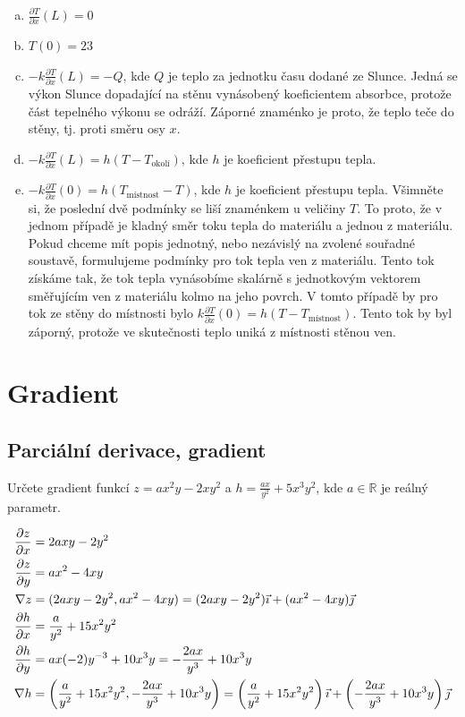 \begin{enumerate}[a)]
\item $\frac{\partial T}{\partial x}(L)=0$
\item $T(0)=23$
\item $-k\frac{\partial T}{\partial x}(L)=-Q$, kde $Q$ je teplo za jednotku času dodané ze Slunce. Jedná se výkon Slunce dopadající na stěnu vynásobený koeficientem absorbce, protože část tepelného výkonu se odráží. Záporné znaménko je proto, že teplo teče do stěny, tj. proti směru osy $x$.
\item $-k\frac{\partial T}{\partial x}(L)=h(T-T_{\text{okolí}})$, kde $h$ je koeficient přestupu tepla.
\item $-k\frac{\partial T}{\partial x}(0)=h(T_{\text{místnost}}-T)$, kde $h$ je koeficient přestupu tepla.
  Všimněte si, že poslední dvě podmínky se liší znaménkem u veličiny $T$. To proto, že v jednom případě je kladný směr toku tepla do materiálu a jednou z materiálu. Pokud chceme mít popis jednotný, nebo nezávislý na zvolené souřadné soustavě, formulujeme podmínky pro tok tepla ven z materiálu. Tento tok získáme tak, že tok tepla vynásobíme skalárně s jednotkovým vektorem směřujícím ven z materiálu kolmo na jeho povrch. V tomto případě by pro tok ze stěny do místnosti bylo $k\frac{\partial T}{\partial x}(0)=h(T-T_{\text{místnost}})$. Tento tok by byl záporný, protože ve skutečnosti teplo uniká z místnosti stěnou ven.
\end{enumerate}
\konec


\section{Gradient}

\subsection{Parciální derivace, gradient}

Určete gradient funkcí $z=ax^2y-2xy^2$ a $h=\frac {ax}{y^2}+5x^3y^2$, kde $a\in\mathbb R$ je reálný parametr.

\reseni
\begin{align*}
  \pdv{z}{x} &= 2axy-2y^2\\
  \pdv{z}{y} &= ax^2-4xy\\
  \nabla z &= (2axy-2y^2, ax^2-4xy) = (2axy-2y^2)\vec \imath + (ax^2-4xy)\vec \jmath\\
  \pdv{h}{x} &= \frac a{y^2}+15x^2y^2\\
  \pdv{h}{y} &= ax(-2)y^{-3}+10x^3y=-\frac{2ax}{y^3}+10x^3y\\
  \nabla h &= \left(\frac a{y^2}+15x^2y^2, -\frac{2ax}{y^3}+10x^3y\right) = \left(\frac a{y^2}+15x^2y^2\right)\vec \imath + \left(-\frac{2ax}{y^3}+10x^3y\right)\vec \jmath
\end{align*}
\konec

